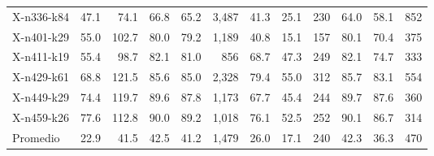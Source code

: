 \begin{tabular}{lrrrrrrrrrrr}
X-n336-k84 & 47.1 & 74.1 & 66.8 & 65.2 & 3,487 & 41.3 & 25.1 & 230 & 64.0 & 58.1 & 852 \\
X-n401-k29 & 55.0 & 102.7 & 80.0 & 79.2 & 1,189 & 40.8 & 15.1 & 157 & 80.1 & 70.4 & 375 \\
X-n411-k19 & 55.4 & 98.7 & 82.1 & 81.0 & 856 & 68.7 & 47.3 & 249 & 82.1 & 74.7 & 333 \\
X-n429-k61 & 68.8 & 121.5 & 85.6 & 85.0 & 2,328 & 79.4 & 55.0 & 312 & 85.7 & 83.1 & 554 \\
X-n449-k29 & 74.4 & 119.7 & 89.6 & 87.8 & 1,173 & 67.7 & 45.4 & 244 & 89.7 & 87.6 & 360 \\
X-n459-k26 & 77.6 & 112.8 & 90.0 & 89.2 & 1,018 & 76.1 & 52.5 & 252 & 90.1 & 86.7 & 314 \\
\midrule
Promedio & 22.9 & 41.5 & 42.5 & 41.2 & 1,479 & 26.0 & 17.1 & 240 & 42.3 & 36.3 & 470 \\
\bottomrule
\end{tabular}
